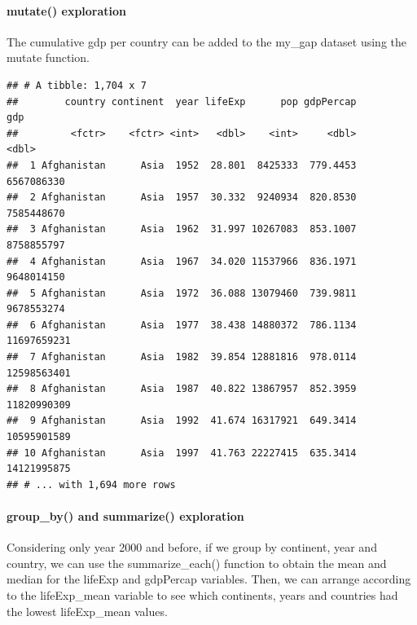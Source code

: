 \documentclass[]{article}
\newenvironment{Shaded}{\begin{snugshade}}{\end{snugshade}}
\newcommand{\KeywordTok}[1]{\textcolor[rgb]{0.13,0.29,0.53}{\textbf{{#1}}}}
\newcommand{\DataTypeTok}[1]{\textcolor[rgb]{0.13,0.29,0.53}{{#1}}}
\newcommand{\DecValTok}[1]{\textcolor[rgb]{0.00,0.00,0.81}{{#1}}}
\newcommand{\StringTok}[1]{\textcolor[rgb]{0.31,0.60,0.02}{{#1}}}
\newcommand{\NormalTok}[1]{{#1}}
\let\oldparagraph\paragraph
\renewcommand{\paragraph}[1]{\oldparagraph{#1}\mbox{}}
\begin{document}
\paragraph{mutate() exploration}\label{mutate-exploration}

The cumulative gdp per country can be added to the my\_gap dataset using
the mutate function.

\begin{Shaded}
\end{Shaded}

\begin{verbatim}
## # A tibble: 1,704 x 7
##        country continent  year lifeExp      pop gdpPercap         gdp
##         <fctr>    <fctr> <int>   <dbl>    <int>     <dbl>       <dbl>
##  1 Afghanistan      Asia  1952  28.801  8425333  779.4453  6567086330
##  2 Afghanistan      Asia  1957  30.332  9240934  820.8530  7585448670
##  3 Afghanistan      Asia  1962  31.997 10267083  853.1007  8758855797
##  4 Afghanistan      Asia  1967  34.020 11537966  836.1971  9648014150
##  5 Afghanistan      Asia  1972  36.088 13079460  739.9811  9678553274
##  6 Afghanistan      Asia  1977  38.438 14880372  786.1134 11697659231
##  7 Afghanistan      Asia  1982  39.854 12881816  978.0114 12598563401
##  8 Afghanistan      Asia  1987  40.822 13867957  852.3959 11820990309
##  9 Afghanistan      Asia  1992  41.674 16317921  649.3414 10595901589
## 10 Afghanistan      Asia  1997  41.763 22227415  635.3414 14121995875
## # ... with 1,694 more rows
\end{verbatim}

\paragraph{group\_by() and summarize()
exploration}\label{group_by-and-summarize-exploration}

Considering only year 2000 and before, if we group by continent, year
and country, we can use the summarize\_each() function to obtain the
mean and median for the lifeExp and gdpPercap variables. Then, we can
arrange according to the lifeExp\_mean variable to see which continents,
years and countries had the lowest lifeExp\_mean values.

\begin{Shaded}
\end{Shaded}
\end{document}
